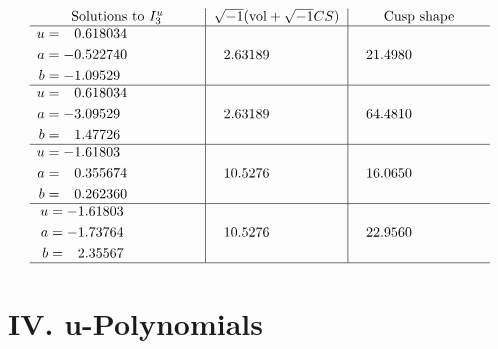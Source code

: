 \documentclass[1p]{elsarticle_modified}
\theoremstyle{definition}
\newcommand{\I}{\sqrt{-1}}
\begin{document}
$$\begin{array}{c|c|c}  
\text{Solutions to }I^u_{3}& \I (\text{vol} + \sqrt{-1}CS) & \text{Cusp shape}\\
 \hline 
\begin{aligned}
u &= \phantom{-}0.618034\phantom{ +0.000000I} \\
a &= -0.522740\phantom{ +0.000000I} \\
b &= -1.09529\phantom{ +0.000000I}\end{aligned}
 & \phantom{-}2.63189\phantom{ +0.000000I} & \phantom{-}21.4980\phantom{ +0.000000I} \\ \hline\begin{aligned}
u &= \phantom{-}0.618034\phantom{ +0.000000I} \\
a &= -3.09529\phantom{ +0.000000I} \\
b &= \phantom{-}1.47726\phantom{ +0.000000I}\end{aligned}
 & \phantom{-}2.63189\phantom{ +0.000000I} & \phantom{-}64.4810\phantom{ +0.000000I} \\ \hline\begin{aligned}
u &= -1.61803\phantom{ +0.000000I} \\
a &= \phantom{-}0.355674\phantom{ +0.000000I} \\
b &= \phantom{-}0.262360\phantom{ +0.000000I}\end{aligned}
 & \phantom{-}10.5276\phantom{ +0.000000I} & \phantom{-}16.0650\phantom{ +0.000000I} \\ \hline\begin{aligned}
u &= -1.61803\phantom{ +0.000000I} \\
a &= -1.73764\phantom{ +0.000000I} \\
b &= \phantom{-}2.35567\phantom{ +0.000000I}\end{aligned}
 & \phantom{-}10.5276\phantom{ +0.000000I} & \phantom{-}22.9560\phantom{ +0.000000I}\\
 \hline 
 \end{array}$$\newpage
\newpage\renewcommand{\arraystretch}{1}
\centering \section*{ IV. u-Polynomials}
\end{document}
